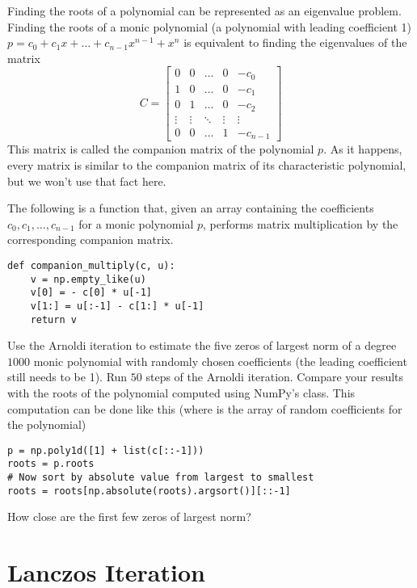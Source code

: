 \begin{problem}
Finding the roots of a polynomial can be represented as an eigenvalue problem.
Finding the roots of a monic polynomial (a polynomial with leading coefficient 1) $p = c_0 + c_1 x + \dots + c_{n-1} x^{n-1} + x^n$ is equivalent to finding the eigenvalues of the matrix
\[C = \begin{bmatrix}
0 & 0 & \dots & 0 & -c_0 \\
1 & 0 & \dots & 0 & -c_1 \\
0 & 1 & \dots & 0 & -c_2 \\
\vdots & \vdots & \ddots & \vdots & \vdots \\
0 & 0 & \dots & 1 & -c_{n-1} \end{bmatrix}\]
This matrix is called the companion matrix of the polynomial $p$.
As it happens, every matrix is similar to the companion matrix of its characteristic polynomial, but we won't use that fact here.

The following is a function that, given an array containing the coefficients $c_0, c_1, \dots, c_{n-1}$ for a monic polynomial $p$, performs matrix multiplication by the corresponding companion matrix.
\begin{lstlisting}
def companion_multiply(c, u):
    v = np.empty_like(u)
    v[0] = - c[0] * u[-1]
    v[1:] = u[:-1] - c[1:] * u[-1]
    return v
\end{lstlisting}

Use the Arnoldi iteration to estimate the five zeros of largest norm of a degree $1000$ monic polynomial with randomly chosen coefficients (the leading coefficient still needs to be 1).
Run $50$ steps of the Arnoldi iteration.
Compare your results with the roots of the polynomial computed using NumPy's  class.
This computation can be done like this (where  is the array of random coefficients for the polynomial)
\begin{lstlisting}
p = np.poly1d([1] + list(c[::-1]))
roots = p.roots
# Now sort by absolute value from largest to smallest
roots = roots[np.absolute(roots).argsort()][::-1]
\end{lstlisting}
How close are the first few zeros of largest norm?
\end{problem}

\section*{Lanczos Iteration}

